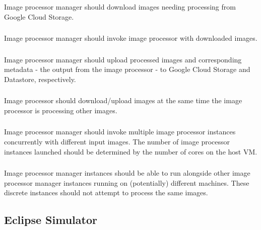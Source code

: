 \documentclass[10pt, onecolumn, draftclsnofoot, letterpaper, compsoc]{IEEEtran}
\begin{document}
    \subsubsection{} 
    Image processor manager should download images needing processing 
    from Google Cloud Storage. \\

    \subsubsection{} 
    Image processor manager should invoke image processor with downloaded images. \\

    \subsubsection{} 
    Image processor manager should upload processed images and corresponding metadata 
    - the output from the image processor - to Google Cloud Storage and Datastore, respectively. \\

    \subsubsection{} 
    Image processor should download/upload images at the same time the image processor 
    is processing other images. \\

    \subsubsection{} 
    Image processor manager should invoke multiple image processor instances concurrently 
    with different input images. The number of image processor instances launched should be 
    determined by the number of cores on the host VM. \\

    \subsubsection{} 
    Image processor manager instances should be able to run alongside other image processor 
    manager instances running on (potentially) different machines. These discrete instances should 
    not attempt to process the same images. \\

\subsection{Eclipse Simulator}
\end{document}
